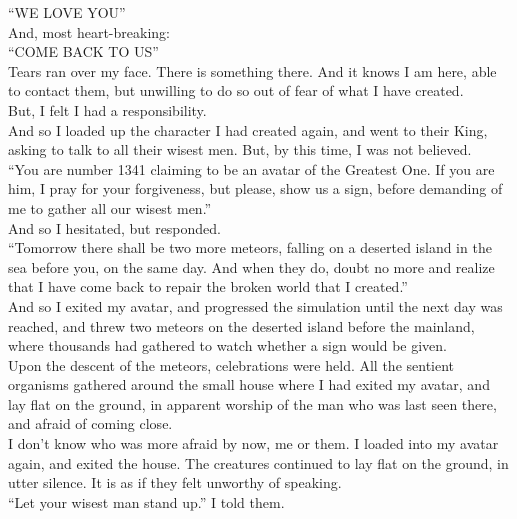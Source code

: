 \documentclass[a5paper]{scrartcl}
\begin{document}
\enquote{WE LOVE YOU}\\


And, most heart-breaking:\\


\enquote{COME BACK TO US}\\


Tears ran over my face. There is something there. And it knows I am here, able to contact them, but unwilling to do so out of fear of what I have created.\\


But, I felt I had a responsibility.\\


And so I loaded up the character I had created again, and went to their King, asking to talk to all their wisest men. But, by this time, I was not believed. \\


\enquote{You are number 1341 claiming to be an avatar of the Greatest One. If you are him, I pray for your forgiveness, but please, show us a sign, before demanding of me to gather all our wisest men.}\\


And so I hesitated, but responded.\\


\enquote{Tomorrow there shall be two more meteors, falling on a deserted island in the sea before you, on the same day. And when they do, doubt no more and realize that I have come back to repair the broken world that I created.}\\


And so I exited my avatar, and progressed the simulation until the next day was reached, and threw two meteors on the deserted island before the mainland, where thousands had gathered to watch whether a sign would be given.\\


Upon the descent of the meteors, celebrations were held. All the sentient organisms gathered around the small house where I had exited my avatar, and lay flat on the ground, in apparent worship of the man who was last seen there, and afraid of coming close.\\


I don't know who was more afraid by now, me or them. I loaded into my avatar again, and exited the house. The creatures continued to lay flat on the ground, in utter silence. It is as if they felt unworthy of speaking.\\


\enquote{Let your wisest man stand up.} I told them.\\
\end{document}
